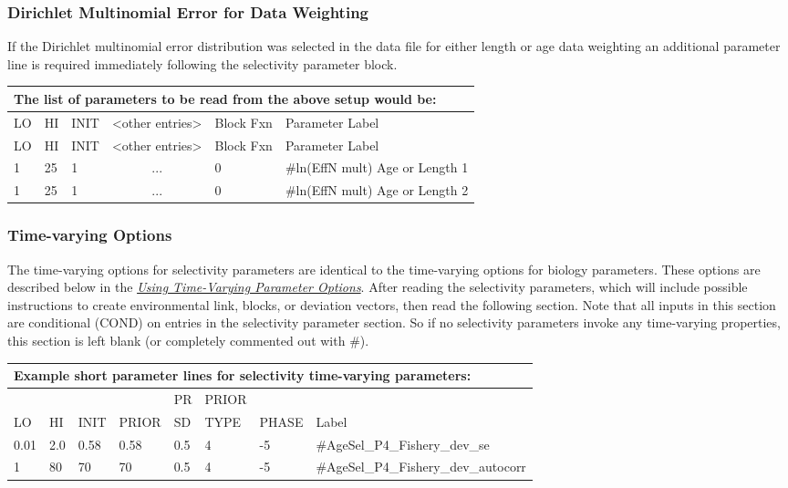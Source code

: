 \hypertarget{Dirichletparameter}{}
\subsubsection{Dirichlet Multinomial Error for Data Weighting}
If the Dirichlet multinomial error distribution was selected in the data file for either length or age data weighting an additional parameter line is required immediately following the selectivity parameter block. 

	
	
\begin{longtable}{p{1cm} p{1cm} p{1cm} p{2.9cm}  p{1.8cm}  p{6.5cm}}
	\multicolumn{6}{l}{The list of parameters to be read from the above setup would be:}\\
	\hline
	LO \Tstrut & HI & INIT  &  <other entries> & Block Fxn & Parameter Label\Bstrut\\
	\hline
	\endfirsthead
	
	\hline
	LO \Tstrut & HI & INIT & <other entries> & Block Fxn & Parameter Label\Bstrut\\
	\hline
	\endhead

	1    & 25 & 1  & \multicolumn{1}{c}{...}  & 0   & \#ln(EffN mult) Age or Length 1 \Tstrut\\
	1    & 25 & 1  & \multicolumn{1}{c}{...}  & 0   & \#ln(EffN mult) Age or Length 2\Bstrut\\
	\hline
\end{longtable}


\subsubsection{Time-varying Options}
The time-varying options for selectivity parameters are identical to the time-varying options for biology parameters.  These options are described below in the \hyperlink{TVpara}{\textit{Using Time-Varying Parameter Options}}.  After reading the selectivity parameters, which will include possible instructions to create environmental link, blocks, or deviation vectors, then read the following section.  Note that all inputs in this section are conditional (COND) on entries in the selectivity parameter section.  So if no selectivity parameters invoke any time-varying properties, this section is left blank (or completely commented out with \#).


\begin{longtable}{p{0.8cm} p{0.8cm} p{1.1cm} p{1.0cm} p{0.8cm}p{1cm} p{1.2cm} p{6.5cm}}
	\multicolumn{8}{l}{Example short parameter lines for selectivity time-varying parameters:}\\
	\hline
	\Tstrut& &  &  & PR & PRIOR  & &  \\
	LO & HI & INIT & PRIOR & SD & TYPE & PHASE & Label \Bstrut\\
	\hline
	0.01 & 2.0 & 0.58 & 0.58 &  0.5  & 4 & -5 & \#AgeSel\_P4\_Fishery\_dev\_se\Tstrut\\
	1    & 80  & 70   & 70   &  0.5  & 4 & -5 & \#AgeSel\_P4\_Fishery\_dev\_autocorr\Bstrut\\
	\hline
\end{longtable}




